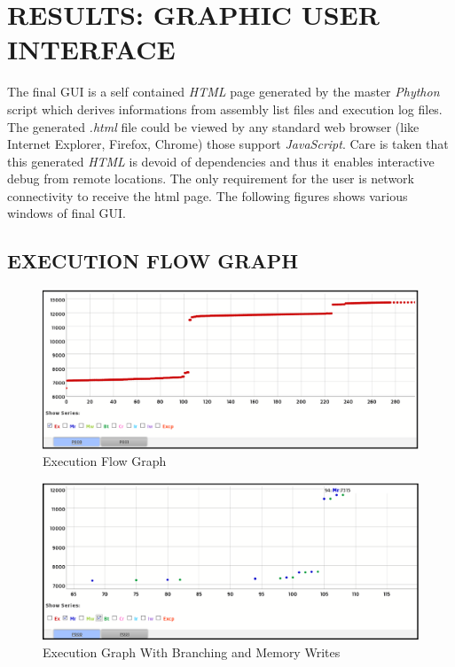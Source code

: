 \chapter{RESULTS: GRAPHIC USER INTERFACE}
\label{chap:GUI_results.tex}
The final GUI is a self contained {\it HTML} page generated by the master {\it Phython} script which derives informations from assembly list files and execution log files. The generated {\it .html} file could be viewed by any standard web browser (like Internet Explorer, Firefox, Chrome) those support {\it JavaScript}. Care is taken that this generated {\it HTML} is devoid of dependencies and thus it enables interactive debug from remote locations. The only requirement for the user is network connectivity to receive the html page. The following figures shows various windows of final GUI.
\section {EXECUTION FLOW GRAPH}
\begin{figure}[h]
\centering
\includegraphics[width=6in]{./figures/gui_graph1.eps}
\caption{Execution Flow Graph}
\label{fig:gui_graph1.eps}
\end{figure}

\begin{figure}[h]
\centering
\includegraphics[width=6in]{./figures/gui_graph2.eps}
\caption{Execution Graph With Branching and Memory Writes}
\label{fig:gui_graph2.eps}
\end{figure}

